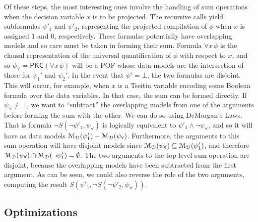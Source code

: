 \documentclass[letterpaper,USenglish,cleveref, autoref, thm-restate]{lipics-v2021}
\newcommand{\nil}{\bot}
\newcommand{\dmodelset}{{\cal M_{D}}}
\newcommand{\ureduce}[2]{\forall #2\, #1}
\newcommand{\algo}[1]{\textsf{#1}}
\newcommand{\pkc}{\algo{PKC}}
\begin{document}
Of these steps, the most interesting ones involve the handling of sum
operations when the decision variable $x$ is to be projected.  The
recursive calls yield subformulas $\psi'_1$ and $\psi'_2$, representing the projected compilation of $\phi$ when $x$ is assigned $1$ and $0$, respectively.
These
formulas potentially have overlapping models and so care must be taken
in forming their sum.  Formula $\ureduce{\phi}{x}$ is the clausal
representation of the universal quantification of $\phi$ with respect
to $x$, and so $\psi_{\forall} = \pkc(\ureduce{\phi}{x})$ will be a POF whose
data models are the intersection of those for $\psi_1'$ and $\psi_2'$.  In
the event that $\psi' = \nil$, the two formulas are disjoint.  This
will occur, for example, when $x$ is a Tseitin variable encoding some
Boolean formula over the data variables.  In that case, the sum can be
formed directly.  If $\psi_{\forall} \not = \nil$, we want to
``subtract'' the overlapping models from one of the arguments before
forming the sum with the other.  We can do so using DeMorgan's Laws.  
That is formula $\neg S(\neg \psi'_1, \psi_{\forall})$ is logically equivalent to $\psi'_1 \land \neg \psi_{\forall}$,
and so it
will have as data models $\dmodelset(\psi'_1) - \dmodelset(\psi_{\forall})$.  Furthermore, the arguments to this sum operation will have disjoint models
since $\dmodelset(\psi_{\forall}) \subseteq \dmodelset(\psi'_1)$, and therefore
$\dmodelset(\psi_{\forall}) \cap \dmodelset(\neg \psi'_1) = \emptyset$.
The two arguments to the top-level sum operation are disjoint, because the overlapping models have been subtracted from the first argument.
As can be seen, we could also reverse the role of the two arguments, computing the result
$S(\psi'_1, \neg S(\neg \psi'_2, \psi_{\forall}))$.


\subsection{Optimizations}
\end{document}

